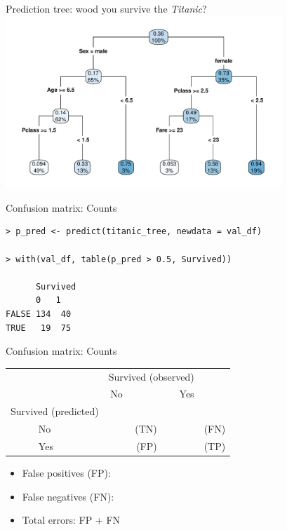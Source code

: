 \documentclass[xcolor=table,aspectratio=169]{beamer}
\begin{document}
\begin{frame}{Prediction tree: wood you survive the \emph{Titanic}?}
	\includegraphics[width=0.78\textwidth]{pics/Titanic_tree}
\end{frame}

\begin{frame}[fragile]{Confusion matrix: Counts}
	\begin{footnotesize}
\begin{verbatim}
> p_pred <- predict(titanic_tree, newdata = val_df)

> with(val_df, table(p_pred > 0.5, Survived))

      Survived
      0   1
FALSE 134  40
TRUE   19  75
\end{verbatim}
	\end{footnotesize}
\end{frame}

\begin{frame}
	{Confusion matrix: Counts}
	
	\begin{tabular}[h]{llrrrrr}
		\toprule
		&    &\multicolumn{4}{c}{Survived (observed)}\\
		&   & No & &&Yes\\
		\midrule
		
		\multicolumn{2}{c}{Survived (predicted)}\\
		& No & \color{ForestGreen}{134} & (TN) & &  \color{red}{40} & (FN)\\
		& Yes & \color{red}{19} & (FP)& & \color{ForestGreen}{75} & (TP)\\
		\bottomrule
	\end{tabular}
	
	\bigskip
	\begin{itemize}
		\item False positives (FP): {\color{red}{19}}
		\item False negatives (FN): {\color{red}{40}}
		\item Total errors: FP + FN
	\end{itemize}
\end{frame}
\end{document}
